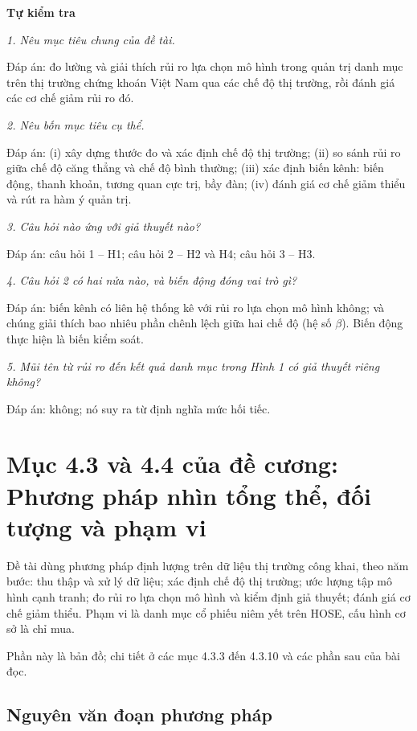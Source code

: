 \textbf{Tự kiểm tra}

{\itshape 1. Nêu mục tiêu chung của đề tài.\par}

Đáp án: đo lường và giải thích rủi ro lựa chọn mô hình trong quản trị danh mục trên thị trường chứng khoán Việt Nam qua các chế độ thị trường, rồi đánh giá các cơ chế giảm rủi ro đó.

{\itshape 2. Nêu bốn mục tiêu cụ thể.\par}

Đáp án: (i) xây dựng thước đo và xác định chế độ thị trường; (ii) so sánh rủi ro giữa chế độ căng thẳng và chế độ bình thường; (iii) xác định biến kênh: biến động, thanh khoản, tương quan cực trị, bầy đàn; (iv) đánh giá cơ chế giảm thiểu và rút ra hàm ý quản trị.

{\itshape 3. Câu hỏi nào ứng với giả thuyết nào?\par}

Đáp án: câu hỏi 1 -- H1; câu hỏi 2 -- H2 và H4; câu hỏi 3 -- H3.

{\itshape 4. Câu hỏi 2 có hai nửa nào, và biến động đóng vai trò gì?\par}

Đáp án: biến kênh có liên hệ thống kê với rủi ro lựa chọn mô hình không; và chúng giải thích bao nhiêu phần chênh lệch giữa hai chế độ (hệ số \texorpdfstring{$\beta$}{beta}). Biến động thực hiện là biến kiểm soát.

{\itshape 5. Mũi tên từ rủi ro đến kết quả danh mục trong Hình 1 có giả thuyết riêng không?\par}

Đáp án: không; nó suy ra từ định nghĩa mức hối tiếc.

\chapter{Mục 4.3 và 4.4 của đề cương: Phương pháp nhìn tổng thể, đối tượng và phạm vi}

Đề tài dùng phương pháp định lượng trên dữ liệu thị trường công khai, theo năm bước: thu thập và xử lý dữ liệu; xác định chế độ thị trường; ước lượng tập mô hình cạnh tranh; đo rủi ro lựa chọn mô hình và kiểm định giả thuyết; đánh giá cơ chế giảm thiểu. Phạm vi là danh mục cổ phiếu niêm yết trên HOSE, cấu hình cơ sở là chỉ mua.

Phần này là bản đồ; chi tiết ở các mục 4.3.3 đến 4.3.10 và các phần sau của bài đọc.

\section{Nguyên văn đoạn phương pháp}

